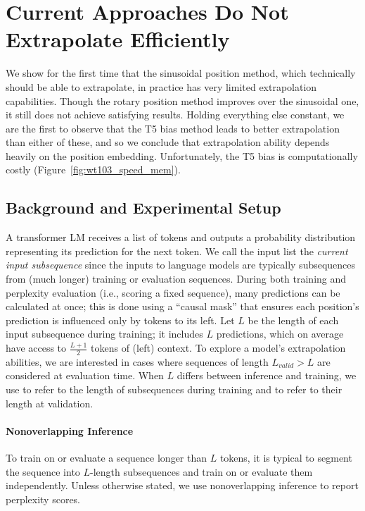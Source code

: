 \section{Current Approaches Do Not Extrapolate Efficiently }
\label{sec:act2}

 

We show for the first time that the sinusoidal position method, which technically should be able to extrapolate, in practice has very limited extrapolation capabilities. Though the rotary position method improves over the sinusoidal one, it still does not achieve satisfying results.  Holding everything else constant, we are the first to observe that the T5 bias method leads to better extrapolation than either of these, and so we conclude that extrapolation ability depends heavily on the position embedding.  Unfortunately, the T5 bias is computationally costly (Figure~\ref{fig:wt103_speed_mem}).


\subsection{Background and Experimental Setup}

A transformer LM receives a list of tokens 
and outputs a probability distribution representing its prediction for the next token.  We call the input list the \textit{current input subsequence} since the inputs to language models are typically subsequences from (much longer) training or evaluation sequences.  During both training and perplexity evaluation (i.e., scoring a fixed sequence), many predictions can be calculated at once; this is done using a ``causal mask'' that ensures each position's prediction is influenced only by tokens to its left.  Let $L$ be the length of each input subsequence during training; it includes $L$ predictions, which on average have access to $\frac{L+1}{2}$ tokens of (left) context.  %
To explore a model's extrapolation abilities, we are interested in cases where sequences of length $L_{\textit{valid}} > L$ are considered at evaluation time. %
When $L$ differs between inference and training, we use \lt to refer to the length of subsequences during training and \li  to refer to their length at validation. 



\paragraph{Nonoverlapping Inference}
To train on or evaluate a sequence longer than $L$ tokens, it is typical to segment the sequence into $L$-length subsequences and train on or evaluate them independently.  Unless otherwise stated, we use nonoverlapping inference to report perplexity scores. %




